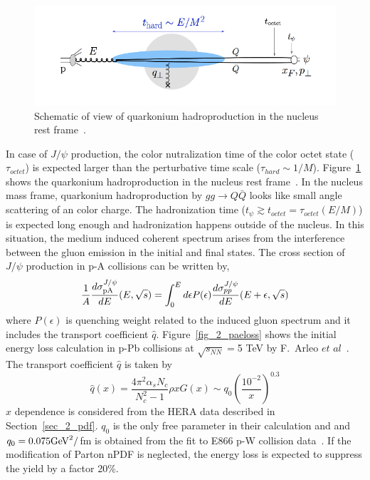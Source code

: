 \begin{figure}[!h]
    \begin{center}
      \includegraphics[width=12cm]{chap2/figure/eloss/eloss_arelo.png}
    \end{center}
  \caption{
  	Schematic of view of quarkonium hadroproduction in the nucleus rest frame~\cite{bib_jpsipaeloss}. 
  }
  \label{fig_2_jpsipaeloss}
\end{figure}

In case of $J/\psi$ production, the color nutralization time of the color octet state ($\tau_{octet}$) is expected larger than the perturbative time scale ($\tau_{hard}\sim 1/M$). 
Figure~\ref{fig_2_jpsipaeloss} shows the quarkonium hadroproduction in the nucleus rest frame~\cite{bib_jpsipaeloss}. 
In the nucleus mass frame, quarkonium hadroproduction by $gg\rightarrow Q\bar{Q}$ looks like small angle scattering of an color charge. 
The hadronization time ($t_{\psi} \gtrsim t_{octet} = \tau_{octet}(E/M)$) is expected long enough and hadronization happens outside of the nucleus.  
In this situation, the medium induced coherent spectrum arises from the interference between the gluon emission in the initial and final states.
The cross section of $J/\psi$ production in p-A collisions can be written by, 
\begin{equation}
	\frac{1}{A}\frac{d\sigma^{J/\psi}_{\rm{p}A}}{dE}(E, \sqrt{s})  = \int^{E}_{0}d\epsilon P (\epsilon ) \frac{d\sigma^{J/\psi}_{pp}}{dE}(E +\epsilon , \sqrt{s})
\end{equation}
where $P (\epsilon )$ is quenching weight related to the induced gluon spectrum and it includes the transport coefficient $\hat{q}$.
Figure~\ref{fig_2_paeloss} shows the initial energy loss calculation in p-Pb collisions at $\sqrt{s_{NN}}=$5 TeV by F.~Arleo $et$ $al$~\cite{bib_jpsipaeloss}. 
The transport coefficient $\hat{q}$ is taken by 
\begin{equation}
	\hat{q} (x) = \frac{4\pi^{2}\alpha_{s}N_{c}}{N_{c}^{2}-1}\rho xG(x) \sim q_{0}(\frac{10^{-2}}{x})^{0.3}
\end{equation}
$x$ dependence is considered from the HERA data described in Section~\ref{sec_2_pdf}. 
$q_{0}$ is the only free parameter in their calculation and and $q_{0} = 0.075 \rm{GeV}^{2}/$fm is obtained from the fit to E866 p-W collision data~\cite{bib_e866}.   
If the modification of Parton nPDF is neglected, the energy loss is expected to suppress the yield by a factor 20\%.

